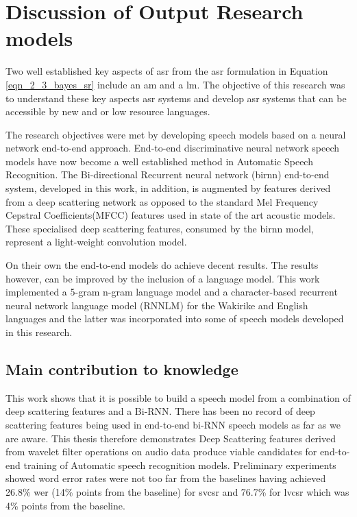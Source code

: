 \section{Discussion of Output Research models}

Two well established key aspects of \acrshort{asr} from the \acrshort{asr} formulation in Equation \ref{eqn_2_3_bayes_sr} include an \acrfull{am} and a \acrfull{lm}. The objective of this research was to understand these key aspects \acrshort{asr} systems and develop \acrshort{asr} systems that can be accessible by new and or low resource languages.

The research objectives were met by developing speech models based on a neural network end-to-end approach. End-to-end discriminative neural network speech models have now become a well established method in Automatic Speech Recognition.   The Bi-directional Recurrent neural network (\acrshort{birnn}) end-to-end system, developed in this work, in addition, is augmented by features derived from a deep scattering network as opposed to the standard Mel Frequency Cepstral Coefficients(MFCC) features used in state of the art acoustic models.  These specialised deep scattering features, consumed by the \acrshort{birnn} model, represent a light-weight convolution model. 

On their own the end-to-end models do achieve decent results. The results however,  can be improved by the inclusion of a language model.  This work implemented a 5-gram n-gram language model and a character-based recurrent neural network language model (RNNLM) for the Wakirike and English languages and the latter was incorporated into some of speech models developed in this research.

\subsection{Main contribution to knowledge}
This work shows that it is possible to build a speech model from a combination of deep scattering features and a Bi-RNN. There has been no record of deep scattering features being used in end-to-end bi-RNN speech models as far as we are aware.  This thesis therefore demonstrates Deep Scattering features derived from wavelet filter operations on audio data produce viable candidates for end-to-end training of Automatic speech recognition models.  Preliminary experiments showed word error rates were not too far from the baselines having achieved 26.8\% \acrshort{wer} (14\% points from the baseline) for \acrshort{svcsr} and 76.7\% for \acrshort{lvcsr} which was 4\% points from the baseline.

